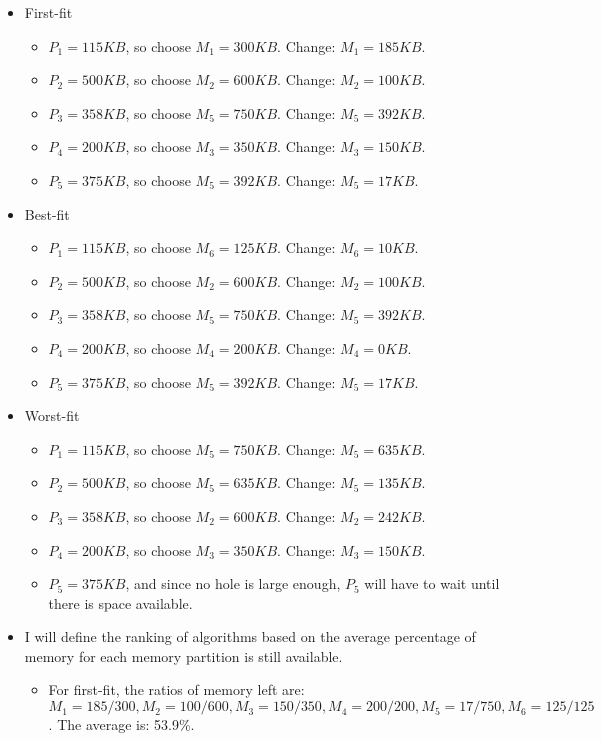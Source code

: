 \documentclass[12pt]{article}
\begin{document}
\begin{itemize}
\item First-fit
\begin{itemize}
\item $P_{1} = 115KB$, so choose $M_{1} = 300KB$. Change: $M_{1} = 185KB$.
\item $P_{2} = 500KB$, so choose $M_{2} = 600KB$. Change: $M_{2} = 100KB$.
\item $P_{3} = 358KB$, so choose $M_{5} = 750KB$. Change: $M_{5} = 392KB$.
\item $P_{4} = 200KB$, so choose $M_{3} = 350KB$. Change: $M_{3} = 150KB$.
\item $P_{5} = 375KB$, so choose $M_{5} = 392KB$. Change: $M_{5} = 17KB$.
\end{itemize}
\item Best-fit
\begin{itemize}
\item $P_{1} = 115KB$, so choose $M_{6} = 125KB$. Change: $M_{6} = 10KB$.
\item $P_{2} = 500KB$, so choose $M_{2} = 600KB$. Change: $M_{2} = 100KB$.
\item $P_{3} = 358KB$, so choose $M_{5} = 750KB$. Change: $M_{5} = 392KB$.
\item $P_{4} = 200KB$, so choose $M_{4} = 200KB$. Change: $M_{4} = 0KB$.
\item $P_{5} = 375KB$, so choose $M_{5} = 392KB$. Change: $M_{5} = 17KB$.
\end{itemize}
\item Worst-fit
\begin{itemize}
\item $P_{1} = 115KB$, so choose $M_{5} = 750KB$. Change: $M_{5} = 635KB$.
\item $P_{2} = 500KB$, so choose $M_{5} = 635KB$. Change: $M_{5} = 135KB$.
\item $P_{3} = 358KB$, so choose $M_{2} = 600KB$. Change: $M_{2} = 242KB$.
\item $P_{4} = 200KB$, so choose $M_{3} = 350KB$. Change: $M_{3} = 150KB$.
\item $P_{5} = 375KB$, and since no hole is large enough, $P_{5}$ will have to wait until there is space available.
\end{itemize}
\item I will define the ranking of algorithms based on the average percentage of memory for each memory partition is still available. 
\begin{itemize}
\item For first-fit, the ratios of memory left are: $M_{1} = 185/300, M_{2} = 100/600, M_{3} = 150/350, M_{4} = 200/200, M_{5} = 17/750, M_{6} = 125/125$. The average is: 53.9\%.

\end{itemize}
\end{itemize}
\end{document}
